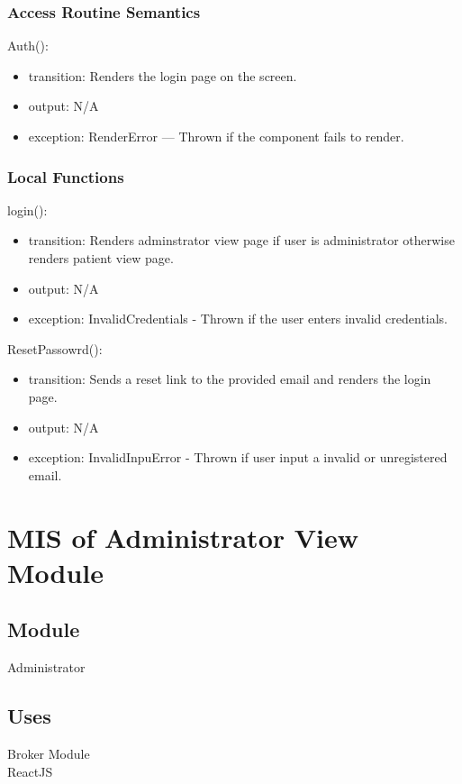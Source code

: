 \documentclass[12pt, titlepage]{article}
\begin{document}
\subsubsection{Access Routine Semantics}

\noindent Auth():
\begin{itemize}
\item transition: Renders the login page on the screen.
\item output: N/A
\item exception: RenderError — Thrown if the component fails to render.
\end{itemize}

\subsubsection{Local Functions}

\noindent login():
\begin{itemize}
\item transition: Renders adminstrator view page if user is administrator otherwise renders patient view page. 
\item output: N/A
\item exception: InvalidCredentials - Thrown if the user enters invalid credentials.
\end{itemize}

\noindent ResetPassowrd():
\begin{itemize}
\item transition: Sends a reset link to the provided email and renders the login page.
\item output: N/A
\item exception: InvalidInpuError - Thrown if user input a invalid or unregistered email.
\end{itemize}

\newpage


\section{MIS of Administrator View Module} \label{Module_ AdminView}

\subsection{Module}
Administrator

\subsection{Uses}
Broker Module \\
ReactJS\\
\end{document}
